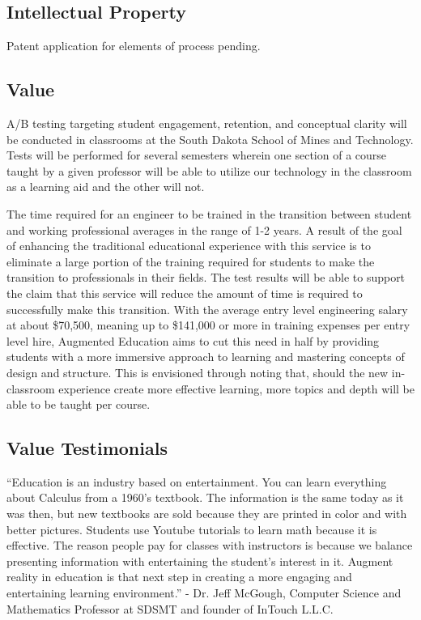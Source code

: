 \subsection{Intellectual Property}
Patent application for elements of process pending. 

\subsection{Value} 
A/B testing targeting student engagement, retention, and conceptual clarity will be conducted in classrooms at the South Dakota School of Mines and Technology. Tests will be performed for several semesters wherein one section of a course taught by a given professor will be able to utilize our technology in the classroom as a learning aid and the other will not. 

The time required for an engineer to be trained in the transition between student and working professional averages in the range of 1-2 years. A result of the goal of enhancing the traditional educational experience with this service is to eliminate a large portion of the training required for students to make the transition to professionals in their fields. The test results will be able to support the claim that this service will reduce the amount of time is required to successfully make this transition.  With the average entry level engineering salary at about \$70,500, meaning up to \$141,000 or more in training expenses per entry level hire, Augmented Education aims to cut this need in half by providing students with a more immersive approach to learning and mastering concepts of design and structure. This is envisioned through noting that, should the new in-classroom experience create more effective learning, more topics and depth will be able to be taught per course. 

\subsection{Value Testimonials}
“Education is an industry based on entertainment. You can learn everything about Calculus from a 1960’s textbook. The information is the same today as it was then, but new textbooks are sold because they are printed in color and with better pictures. Students use Youtube tutorials to learn math because it is effective. The reason people pay for classes with instructors is because we balance presenting information with entertaining the student’s interest in it. Augment reality in education is that next step in creating a more engaging and entertaining learning environment.” - Dr. Jeff McGough, Computer Science and Mathematics Professor at SDSMT and founder of InTouch L.L.C.

